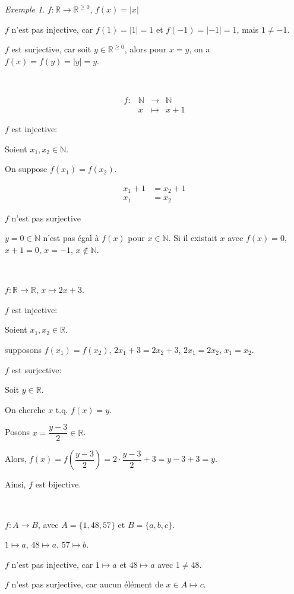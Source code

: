 \documentclass{report}
\newcommand*{\abs}[1]{\left| #1 \right|}
\newcommand*{\reels}{\mathbb{R}}
\newcommand*{\naturels}{\mathbb{N}}
\theoremstyle{definition}
\theoremstyle{remark}
\newtheorem*{exem}{Exemple}
\begin{document}
	\begin{exem}
		$f:\reels \to \reels^{\geq0}$, $f(x)=\abs{x}$

		$f$ n'est pas injective, car $f(1)=\abs{1}=1$ et $f(-1)=\abs{-1}=1$, mais $1 \neq -1$.

		$f$ est surjective, car soit $y \in \reels^{\geq0}$, alors pour $x=y$, on a $f(x)=f(y)=\abs{y}=y$.

		~

		\[
		\begin{array}{rrcl}
			f:&\naturels&\to&\naturels\\
			&x&\mapsto&x+1
		\end{array}
		\]

		$f$ est injective:

		Soient $x_1,x_2 \in \naturels$.

		On suppose $f(x_1)=f(x_2)$.

		\begin{align*}
			x_1+1&= x_2+1\\
			x_1&= x_2
		\end{align*}

		$f$ n'est pas surjective

		$y=0\in\naturels$ n'est pas \'egal \`a $f(x)$ pour $x\in\naturels$. Si il existait $x$ avec $f(x)=0$, $x+1=0$, $x=-1$, $x \not\in \naturels$.

		~

		$f:\reels\to\reels$, $x \mapsto 2x+3$.

		$f$ est injective:

		Soient $x_1,x_2 \in \reels$.

		supposons $f(x_1)=f(x_2)$, $2x_1+3=2x_2+3$, $2x_1=2x_2$, $x_1=x_2$.

		$f$ est surjective:

		Soit $y \in \reels$.

		On cherche $x$ t.q. $f(x)=y$.

		Posons $x=\dfrac{y-3}{2} \in \reels$.

		Alors, $f(x) = f\left( \dfrac{y-3}{2} \right) = 2 \cdot  \dfrac{y-3}{2} + 3 = y-3+3 = y$.

		Ainsi, $f$ est bijective.

		~

		$f:A \to B$, avec $A=\{1,48,57\}$ et $B=\{a,b,c\}$.

		$1 \mapsto a$, $48 \mapsto a$, $57 \mapsto b$.

		$f$ n'est pas injective, car $1 \mapsto a$ et $48 \mapsto a$  avec $1 \neq 48$.

		$f$ n'est pas surjective, car aucun \'el\'ement de $x \in A \mapsto c$.
	\end{exem}
\end{document}

